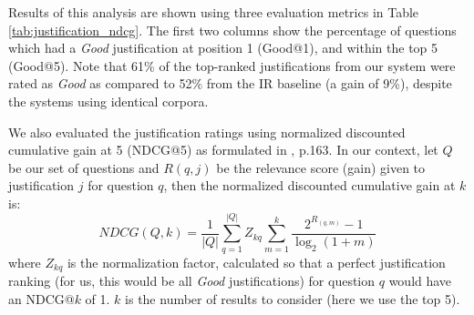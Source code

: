 
Results of this analysis are shown using three evaluation metrics in Table \ref{tab:justification_ndcg}.  The first two columns show the percentage of questions which had a \emph{Good} justification at position 1 (Good@1), and within the top 5 (Good@5).  
Note that 61\% of the top-ranked justifications from our system were rated as \emph{Good} as compared to 52\% from the IR baseline (a gain of 9\%), despite the systems using identical corpora.  

We also evaluated the justification ratings using normalized discounted cumulative gain at 5 (NDCG@5) as formulated in \citet{manning08}, p.163.  In our context, let $Q$ be our set of questions and $R(q,j)$ be the relevance score (gain) given to justification $j$ for question $q$, then the normalized discounted cumulative gain at $k$ is:
\begin{equation}
NDCG(Q, k) = \dfrac{1}{|Q|} \sum_{q=1}^{|Q|} Z_{kq} \sum_{m=1}^k \dfrac{2^{R_{(q,m)}} - 1}{\log_2(1+m)}
\end{equation}
where $Z_{kq}$ is the normalization factor, calculated so that a perfect justification ranking (for us, this would be all \textit{Good} justifications) for question $q$ would have an NDCG@$k$ of 1.  $k$ is the number of results to consider (here we use the top 5).  

